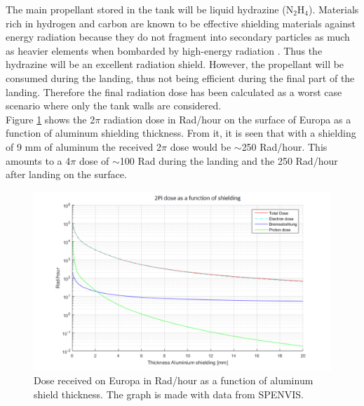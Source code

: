 The main propellant stored in the tank will be liquid hydrazine (N$_2$H$_4$). Materials rich in hydrogen and carbon are known to be effective shielding materials against energy radiation because they do not fragment into secondary particles as much as heavier elements when bombarded by high-energy radiation \cite{rad_shield_2006}. Thus the hydrazine will be an excellent radiation shield. 
However, the propellant will be consumed during the landing, thus not being efficient during the final part of the landing. Therefore the final radiation dose has been calculated as a worst case scenario where only the tank walls are considered. \\

\noindent
Figure \ref{fig:raddose} shows the 2$\pi$ radiation dose in Rad/hour on the surface of Europa as a function of aluminum shielding thickness. From it, it is seen that with a shielding of 9 mm of aluminum the received 2$\pi$ dose would be $\sim$250 Rad/hour. This amounts to a 4$\pi$ dose of $\sim$100 Rad during the landing and the 250 Rad/hour after landing on the surface.

\begin{figure}[htb]
\begin{center}
\includegraphics[scale=0.48]{figures/navtheory/dose}
\caption{Dose received on Europa in Rad/hour as a function of aluminum shield thickness. The graph is made with data from SPENVIS.}
\label{fig:raddose}
\end{center}
\end{figure}
